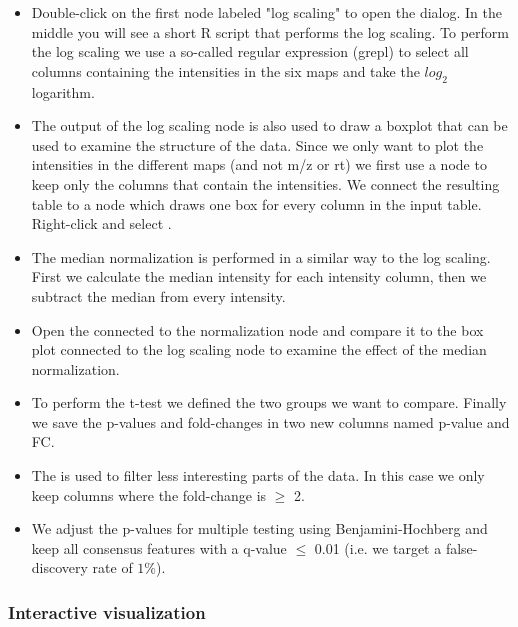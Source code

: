 \begin{itemize}
\item Double-click on the first  node labeled "log scaling" to open the  dialog. In the middle you will see a short R script that performs the log scaling. To perform the log scaling we use a so-called regular expression (grepl) to select all columns containing the intensities in the six maps and take the $log_2$ logarithm.

\item The output of the log scaling node is also used to draw a boxplot that can be used to examine the structure of the data. Since we only want to plot the intensities in the different maps (and not m/z or rt) we first use a  node to keep only the columns that contain the intensities. We connect the resulting table to a  node which draws one box for every column in the input table. Right-click and select .

\item The median normalization is performed in a similar way to the log scaling. First we calculate the median intensity for each intensity column, then we subtract the median from every intensity.

\item Open the  connected to the normalization node and compare it to the box plot connected to the log scaling node to examine the effect of the median normalization.

\item To perform the t-test we defined the two groups we want to compare. Finally we save the p-values and fold-changes in two new columns named p-value and FC.

\item The  is used to filter less interesting parts of the data. In this case we only keep columns where the fold-change is $\geq$ 2.

\item We adjust the p-values for multiple testing using Benjamini-Hochberg and keep all consensus features with a q-value $\leq$ 0.01 (i.e. we target a false-discovery rate of $1\%$).

\end{itemize}


\subsubsection{Interactive visualization}

